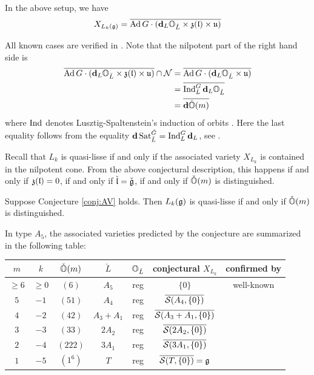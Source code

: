 \documentclass[reqno]{amsart}
\DeclareMathOperator{\Sat}{Sat}
\begin{document}
\begin{conjecture}\label{conj:AV}
	In the above setup, we have
	\begin{equation*}
		X_{L_k(\mathfrak{g})} = \overline{\operatorname{Ad} G \cdot (\mathbf{d}_L \mathbb{O}_{\check L} \times \mathfrak{z}(\mathfrak{l}) \times \mathfrak{u})}
	\end{equation*}
\end{conjecture}

All known cases are verified in \cite[\S 2.4]{SYZ:cl}. Note that the nilpotent part of the right hand side is 
\begin{align*}
	\overline{\operatorname{Ad} G \cdot (\mathbf{d}_L \mathbb{O}_{\check L} \times \mathfrak{z}(\mathfrak{l}) \times \mathfrak{u})} \cap \mathcal{N} 
	&= \overline{\operatorname{Ad} G \cdot (\mathbf{d}_L \mathbb{O}_{\check L} \times \mathfrak{u})}\\
	&= \overline{\operatorname{Ind}_L^G \mathbf{d}_L \mathbb{O}_{\check L}}\\
	&= \overline{\mathbf{d} \check {\mathbb{O}}(m)}
\end{align*}
where $\operatorname{Ind}$ denotes Lusztig-Spaltenstein's induction of orbits \cite{Lusztig-Spaltenstein:induced}. Here the last equality follows from the equality $\bd \Sat_{\check L}^{\check G} = \Ind_L^G \bd_L$, see \cite[Proposition A2(c)]{Barbasch-Vogan:unipotent}.

Recall that $L_k$ is quasi-lisse if and only if the associated variety $X_{L_k}$ is contained in the nilpotent cone. From the above conjectural description, this happens if and only if $\mathfrak{z}(\mathfrak{l}) = 0$, if and only if $\check {\mathfrak{l}} = \check {\mathfrak{g}}$, if and only if $\check {\mathbb{O}}(m)$ is distinguished. 

\begin{corollary}
	Suppose Conjecture \ref{conj:AV} holds. Then $L_k(\mathfrak{g})$ is quasi-lisse if and only if $\check {\mathbb{O}}(m)$ is distinguished.
\end{corollary}

\begin{example}
	In type $A_5$, the associated varieties predicted by the conjecture are summarized in the following table:
	\begin{center} 
		\begin{tabular}{ccccccc}
			\hline $m$ & $k$ & $\check {\mathbb{O}}(m)$ & $\check L$ & $\mathbb{O}_{\check L}$ & conjectural $X_{L_k}$ & confirmed by
			\\ \hline
			$\ge 6$ & $\ge0$ & $(6)$ & $A_5$ & reg & $\{0\}$ & well-known\\
			$5$ & $-1$  & $(51)$ & $A_4$ & reg & $\overline{\mathcal{S}(A_4,\{0\})}$ & 
			\cite{Arakawa-Moreau:Omin,Jiang-Song}\\
			$4$ & $-2$ & $(42)$ & $A_3+A_1$ & reg & $\overline{\mathcal{S}(A_3+A_1,\{0\})}$ & \\
			$3$ & $-3$ & $(33)$ & $2A_2$ & reg & $\overline{\mathcal{S}(2A_2, \{0\})}$ & \cite{AFK}\\
			$2$ & $-4$ & $(222)$ & $3A_1$ & reg & $\overline{\mathcal{S}(3A_1, \{0\})}$\\
			$1$ & $-5$  & $(1^6)$ & $T$ & reg & $\overline{\mathcal{S}(T,\{0\})} =\mathfrak{g}$ & \cite{Gorelik-Kac}
		\end{tabular}
	\end{center}
\end{example}
\end{document}
